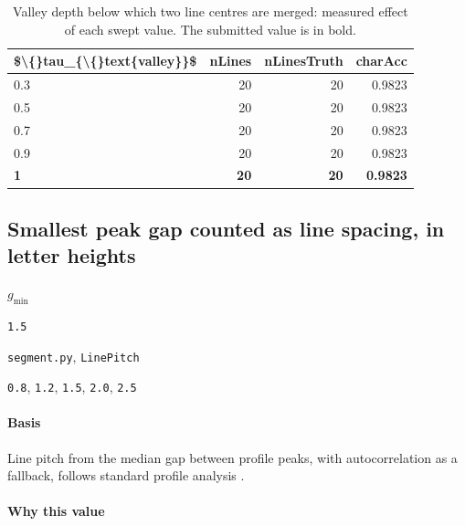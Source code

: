 \begin{table}[htbp]
\centering
\small
\caption{Valley depth below which two line centres are merged: measured effect of each swept value. The submitted value is in bold.}
\begin{tabular}{lrrr}
\toprule
\$\textbackslash\{\}tau\_\{\textbackslash\{\}text\{valley\}\}\$ & \textsf{nLines} & \textsf{nLinesTruth} & \textsf{charAcc} \\
\midrule
0.3 & 20 & 20 & 0.9823 \\
0.5 & 20 & 20 & 0.9823 \\
0.7 & 20 & 20 & 0.9823 \\
0.9 & 20 & 20 & 0.9823 \\
\bfseries 1 & \bfseries 20 & \bfseries 20 & \bfseries 0.9823 \\
\bottomrule
\end{tabular}
\end{table}

\subsection{Smallest peak gap counted as line spacing, in letter heights}

\label{coef:pitch-peak-floor-xh}

\begin{description}[leftmargin=5.2em,style=sameline]

\item[Symbol] $g_{\min}$

\item[Value] \texttt{1.5}

\item[Source] \texttt{segment.py}, \texttt{LinePitch}

\item[Swept] \texttt{0.8}, \texttt{1.2}, \texttt{1.5}, \texttt{2.0}, \texttt{2.5}

\end{description}

\paragraph{Basis}

Line pitch from the median gap between profile peaks, with autocorrelation as a fallback, follows standard profile analysis \cite{likforman2007}.

\paragraph{Why this value}

